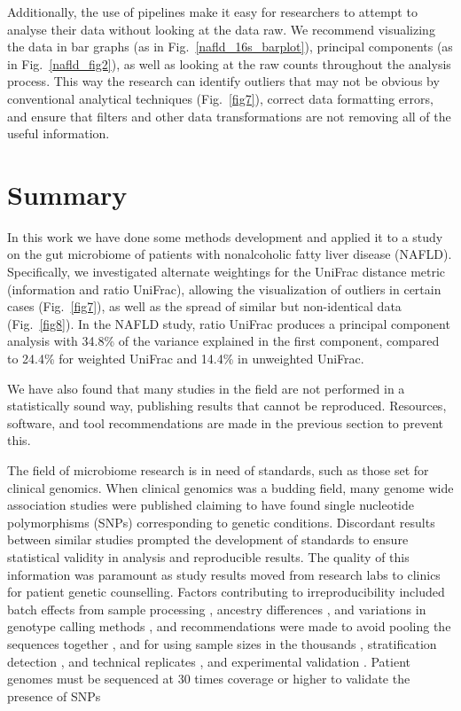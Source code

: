 Additionally, the use of pipelines make it easy for researchers to attempt to analyse their data without looking at the data raw. We recommend visualizing the data in bar graphs (as in Fig.~\ref{nafld_16s_barplot}), principal components (as in Fig.~\ref{nafld_fig2}), as well as looking at the raw counts throughout the analysis process. This way the research can identify outliers that may not be obvious by conventional analytical techniques (Fig.~\ref{fig7}), correct data formatting errors, and ensure that filters and other data transformations are not removing all of the useful information.

\section{Summary}

In this work we have done some methods development and applied it to a study on the gut microbiome of patients with nonalcoholic fatty liver disease (NAFLD). Specifically, we investigated alternate weightings for the UniFrac distance metric (information and ratio UniFrac), allowing the visualization of outliers in certain cases (Fig.~\ref{fig7}), as well as the spread of similar but non-identical data (Fig.~\ref{fig8}). In the NAFLD study, ratio UniFrac produces a principal component analysis with 34.8\% of the variance explained in the first component, compared to 24.4\% for weighted UniFrac and 14.4\% in unweighted UniFrac.

We have also found that many studies in the field are not performed in a statistically sound way, publishing results that cannot be reproduced. Resources, software, and tool recommendations are made in the previous section to prevent this.

The field of microbiome research is in need of standards, such as those set for clinical genomics. When clinical genomics was a budding field, many genome wide association studies were published claiming to have found single nucleotide polymorphisms (SNPs) corresponding to genetic conditions. Discordant results between similar studies prompted the development of standards to ensure statistical validity in analysis and reproducible results. The quality of this information was paramount as study results moved from research labs to clinics for patient genetic counselling. Factors contributing to irreproducibility included batch effects from sample processing \cite{leek2010tackling}, ancestry differences \cite{price2006principal}, and variations in genotype calling methods \cite{miclaus2010variability}, and recommendations were made to avoid pooling the sequences together \cite{mccarthy2008genome}, and for using sample sizes in the thousands \cite{burton2007genome}, stratification detection \cite{price2006principal}, and technical replicates \cite{hong2012technical}, and experimental validation \cite{mccarthy2008genome}. Patient genomes must be sequenced at 30 times coverage or higher to validate the presence of SNPs \cite{rehm2013acmg}


